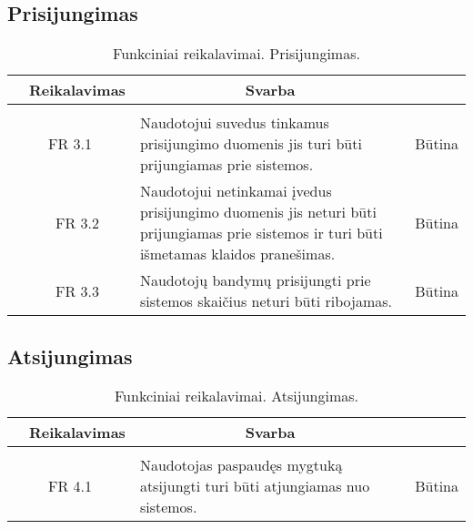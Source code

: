 \documentclass{VUMIFPSkursinis}
\begin{document}
\subsection{Prisijungimas}
\begin{table}[H]
	\caption{Funkciniai reikalavimai. Prisijungimas.}
	\begin{tabular}{|p{1cm}|p{1cm}|p{}|p{}|}
		\hline 
		\rowcolor{gray!50}
		\multicolumn{2}{|c|}{{\bfseries Kodas}}&
		\multicolumn{1}{c|}{{\bfseries Reikalavimas}}&
		\multicolumn{1}{c|}{{\bfseries Svarba}}\\
		\hline
		\rowcolor{lightgray}
		\multicolumn{4}{|c|}{Prisijungimas}\\		
		
		\hline
		\multicolumn{2}{|c|}{FR 3.1}&
		{Naudotojui suvedus tinkamus prisijungimo duomenis jis turi būti prijungiamas prie sistemos.
		}&		
		\multicolumn{1}{c|}{Būtina}\\
		\hline
		\multicolumn{1}{|c}{}&
		\multicolumn{1}{c|}{FR 3.2}&
		{Naudotojui netinkamai įvedus prisijungimo duomenis jis neturi būti prijungiamas prie sistemos ir turi būti išmetamas klaidos pranešimas.
		}&		
		\multicolumn{1}{c|}{Būtina}\\
		\hline	
		\multicolumn{1}{|c}{}&
		\multicolumn{1}{c|}{FR 3.3}&
		{Naudotojų bandymų prisijungti prie sistemos skaičius neturi būti ribojamas.
		}&
		\multicolumn{1}{c|}{Būtina}\\									
		\hline
	\end{tabular}		
\end{table}

\subsection{Atsijungimas}

\begin{table}[H]
	\caption{Funkciniai reikalavimai. Atsijungimas.}
	\begin{tabular}{|p{1cm}|p{1cm}|p{}|p{}|}
		\hline 
		\rowcolor{gray!50}
		\multicolumn{2}{|c|}{{\bfseries Kodas}}&
		\multicolumn{1}{c|}{{\bfseries Reikalavimas}}&
		\multicolumn{1}{c|}{{\bfseries Svarba}}\\
		\hline
		\rowcolor{lightgray}
		\multicolumn{4}{|c|}{Atsijungimas}\\		
		
		\hline
		\multicolumn{2}{|c|}{FR 4.1}&
		{Naudotojas paspaudęs mygtuką atsijungti turi būti atjungiamas nuo sistemos.
		}&		
		\multicolumn{1}{c|}{Būtina}\\
		\hline
	\end{tabular}		
\end{table}
\end{document}
